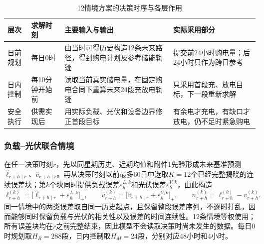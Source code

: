 \documentclass[UTF8,fontset=none,12pt,a4paper]{ctexart}
\begin{document}
\begin{table}[H]\centering\small
\caption{12情境方案的决策时序与各层作用}\label{tab:q2-scenario-timing}
\begin{tabularx}{\linewidth}{p{2.1cm}p{2.2cm}YY}\toprule
层次&求解时刻&主要输入与输出&实际采用部分\\\midrule
日前规划&每日0时&由当时可得历史构造12条未来路径，得到购电计划及参考储能轨迹&提交前24小时购电量；后24小时只作为跨日参考\\
日内控制&每10分钟开始前&读取当前真实储电量，在固定购电合同下重算未来24段充放电轨迹&只采用首段充、放电目标，下一段重新求解\\
安全执行&供需实现后&用实际负载、光伏和设备边界修正首段目标&有余电才充电，有缺口才放电，仍不足时紧急购电\\\bottomrule
\end{tabularx}
\end{table}

\subsubsection{负载--光伏联合情境}
在任一决策时刻$r$，先以同星期历史、近期均值和附件1先验形成未来基准预测$\widehat\ell_{r+h\mid r}$、$\widehat v_{r+h\mid r}$。再从决策时刻以前最多60日中选取$K=12$个已经完整揭晓的连续误差块；第$k$个块同时提供负载误差$\varepsilon_{h}^{L,k}$和光伏误差$\varepsilon_{h}^{V,k}$，由此构造
\begin{equation}
 \ell_{r+h}^{(k)}=\bigl[\widehat\ell_{r+h\mid r}+\varepsilon_h^{L,k}\bigr]_+,
 \qquad
 v_{r+h}^{(k)}=\bigl[\widehat v_{r+h\mid r}+\varepsilon_h^{V,k}\bigr]_+,
 \qquad
 n_{r+h}^{(k)}=\ell_{r+h}^{(k)}-v_{r+h}^{(k)}.
 \label{eq:q2scenario-generation}
\end{equation}
同一情境中的两类误差取自同一历史起点，且保留整段误差序列，不逐时打乱，因而能够同时保留负载与光伏的相关性以及误差的时间连续性。12条情境等权使用；所有误差块均在$r$之前完整结束，因此模型不会读取决策时尚未发生的数据。每日0时规划取$H_R=288$段，日内控制取$H_M=24$段，分别对应48小时和4小时。
\end{document}
